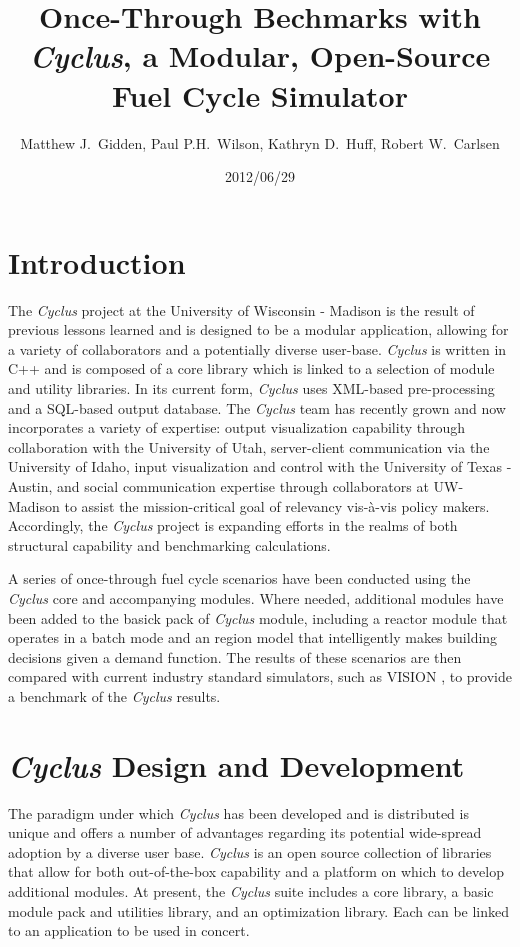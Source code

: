 \documentclass{anstrans}
\title{Once-Through Bechmarks with \emph{Cyclus}, a Modular, Open-Source Fuel Cycle Simulator}
\author{Matthew J.~Gidden, Paul P.H.~Wilson, Kathryn D.~Huff, Robert W.~Carlsen}
\institute{Department of Nuclear Engineering \& Engineering Physics, University of Wisconsin - Madison, Madison, WI, 53703}
\date{2012/06/29}
\begin{document}
\section{Introduction}
The \emph{Cyclus} project at the University of Wisconsin - Madison is the result of previous lessons learned and is designed to be a 
modular application, allowing for a variety of collaborators and a potentially diverse user-base. \emph{Cyclus} is written in C++ and
is composed of a core library which is linked to a selection of module and utility libraries. In its current form, \emph{Cyclus} uses
XML-based pre-processing and a SQL-based output database. The \emph{Cyclus} team has recently grown and now incorporates a variety of 
expertise: output visualization capability through collaboration with the University of Utah, server-client communication via the 
University of Idaho, input visualization and control with the University of Texas - Austin, and social communication expertise 
through collaborators at UW-Madison to assist the mission-critical goal of relevancy vis-\`{a}-vis policy makers. Accordingly, the 
\emph{Cyclus} project is expanding efforts in the realms of both structural capability and benchmarking calculations.

A series of once-through fuel cycle scenarios have been conducted using the \emph{Cyclus} core and accompanying modules. Where needed,
additional modules have been added to the basick pack of \emph{Cyclus} module, including a reactor module that operates in a batch 
mode and an region model that intelligently makes building decisions given a demand function. The results of these scenarios
are then compared with current industry standard simulators, such as VISION \cite{vision2009}, to provide a benchmark of the
\emph{Cyclus} results.
\section{\emph{Cyclus} Design and Development}
The paradigm under which \emph{Cyclus} has been developed and is distributed is unique and offers a number of advantages regarding its 
potential wide-spread adoption by a diverse user base. \emph{Cyclus} is an open source collection of libraries that
allow for both out-of-the-box capability and a platform on which to develop additional modules. At present, the \emph{Cyclus} suite 
includes a core library, a basic module pack and utilities library, and an optimization library. Each can be linked to an 
application to be used in concert.
\end{document}
